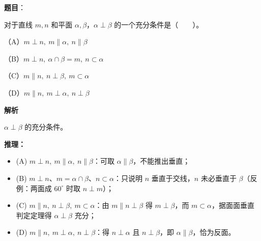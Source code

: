 \begin{answer}

\textbf{题目}：

对于直线 $m,n$ 和平面 $\alpha,\beta$，$\alpha\perp\beta$ 的一个充分条件是\mbox{（　　）}。

（A）$m\perp n,\ m\parallel\alpha,\ n\parallel\beta$

（B）$m\perp n,\ \alpha\cap\beta=m,\ n\subset\alpha$

（C）$m\parallel n,\ n\perp\beta,\ m\subset\alpha$

（D）$m\parallel n,\ m\perp\alpha,\ n\perp\beta$

\textbf{解析}

$\alpha\perp\beta$ 的充分条件。

\textbf{推理：}
\begin{itemize}
\item (A) $m\perp n,\ m\parallel\alpha,\ n\parallel\beta$：可取 $\alpha\parallel\beta$，不能推出垂直；
\item (B) $m\perp n$、$m=\alpha\cap\beta$、$n\subset\alpha$：只说明 $n$ 垂直于交线，$n$ 未必垂直于 $\beta$（反例：两面成 $60^\circ$ 时取 $n\perp m$）；
\item (C) $m\parallel n,\ n\perp\beta,\ m\subset\alpha$：由 $m\parallel n\perp\beta$ 得 $m\perp\beta$，而 $m\subset\alpha$，据面面垂直判定定理得 $\alpha\perp\beta$ 充分；
\item (D) $m\parallel n,\ m\perp\alpha,\ n\perp\beta$：得 $n\perp\alpha$ 且 $n\perp\beta$，即 $\alpha\parallel\beta$，恰为反面。
\end{itemize}


\end{answer}

